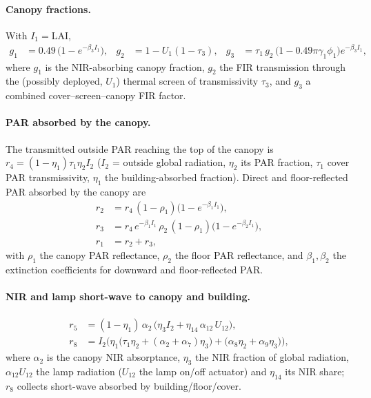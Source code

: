 \documentclass[11pt,a4paper]{article}
\begin{document}
\paragraph{Canopy fractions.} With $I_1=\mathrm{LAI}$,
\begin{align}
  g_1 &= 0.49\,\big(1-e^{-\beta_3 I_1}\big), &
  g_2 &= 1 - U_1(1-\tau_3), &
  g_3 &= \tau_1\,g_2\,\big(1-0.49\pi\gamma_1\phi_1\big)e^{-\beta_3 I_1},
\end{align}
where $g_1$ is the NIR-absorbing canopy fraction, $g_2$ the FIR transmission through the (possibly
deployed, $U_1$) thermal screen of transmissivity $\tau_3$, and $g_3$ a combined cover--screen--canopy
FIR factor.

\paragraph{PAR absorbed by the canopy.} The transmitted outside PAR reaching the top of the canopy is
$r_4=(1-\eta_1)\tau_1\eta_2 I_2$ ($I_2$ = outside global radiation, $\eta_2$ its PAR fraction,
$\tau_1$ cover PAR transmissivity, $\eta_1$ the building-absorbed fraction). Direct and
floor-reflected PAR absorbed by the canopy are
\begin{align}
  r_2 &= r_4\,(1-\rho_1)\big(1-e^{-\beta_1 I_1}\big), \\
  r_3 &= r_4\,e^{-\beta_1 I_1}\,\rho_2\,(1-\rho_1)\big(1-e^{-\beta_2 I_1}\big), \\
  r_1 &= r_2 + r_3,
\end{align}
with $\rho_1$ the canopy PAR reflectance, $\rho_2$ the floor PAR reflectance, and
$\beta_1,\beta_2$ the extinction coefficients for downward and floor-reflected PAR.

\paragraph{NIR and lamp short-wave to canopy and building.}
\begin{align}
  r_5 &= (1-\eta_1)\,\alpha_2\,\big(\eta_3 I_2 + \eta_{14}\,\alpha_{12}\,U_{12}\big), \\
  r_8 &= I_2\Big(\eta_1\big(\tau_1\eta_2 + (\alpha_2+\alpha_7)\eta_3\big) + \big(\alpha_8\eta_2 + \alpha_9\eta_3\big)\Big),
\end{align}
where $\alpha_2$ is the canopy NIR absorptance, $\eta_3$ the NIR fraction of global radiation,
$\alpha_{12}U_{12}$ the lamp radiation ($U_{12}$ the lamp on/off actuator) and $\eta_{14}$ its NIR
share; $r_8$ collects short-wave absorbed by building/floor/cover.
\end{document}
